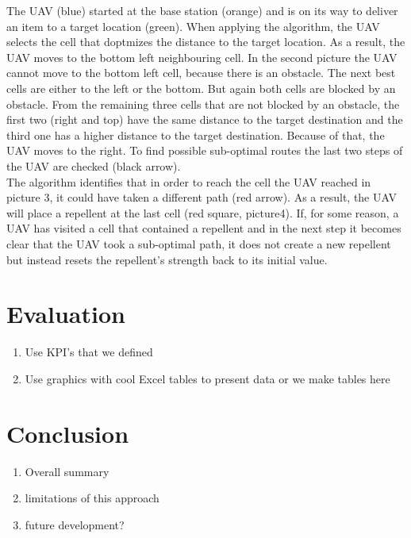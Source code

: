 The UAV (blue) started at the base station (orange) and is on its way to deliver an item to a target location (green). When applying the algorithm, the UAV selects the cell that doptmizes the distance to the target location. As a result, the UAV moves to the bottom left neighbouring cell. In the second picture the UAV cannot move to the bottom left cell, because there is an obstacle. The next best cells are either to the left or the bottom. But again both cells are blocked by an obstacle. From the remaining three cells that are not blocked by an obstacle, the first two (right and top) have the same distance to the target destination and the third one has a higher distance to the target destination. Because of that, the UAV moves to the right. To find possible sub-optimal routes the last two steps of the UAV are checked (black arrow).
\\ 
The algorithm identifies that in order to reach the cell the UAV reached in picture 3, it could have taken a different path (red arrow). As a result, the UAV will place a repellent at the last cell (red square, picture4). If, for some reason, a UAV has visited a cell that contained a repellent and in the next step it becomes clear that the UAV took a sub-optimal path, it does not create a new repellent but instead resets the repellent's strength back to its initial value.

\section{Evaluation}
\begin{enumerate}
	\item Use KPI's that we defined
	\item Use graphics with cool Excel tables to present data or we make tables here
\end{enumerate}

\section{Conclusion}
\begin{enumerate}
	\item Overall summary
	\item limitations of this approach
	\item future development?
\end{enumerate}


